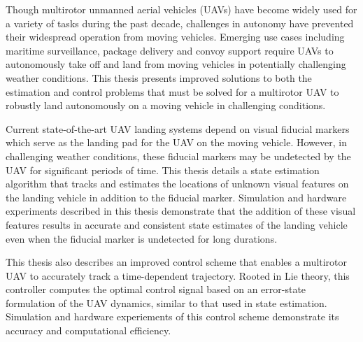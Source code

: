 \afterpage{\cleardoublepage}
Though multirotor unmanned aerial vehicles (UAVs) have become widely used for a variety of
tasks during the past decade, challenges in autonomy have prevented their
widespread operation from moving vehicles. Emerging use cases including maritime
surveillance, package delivery and convoy support require UAVs to autonomously
take off and land from moving vehicles in potentially challenging weather
conditions. This thesis presents improved solutions to both the estimation and
control problems that must be solved for a multirotor UAV to robustly land
autonomously on a moving vehicle in challenging conditions.

Current state-of-the-art UAV landing systems depend on visual fiducial markers
which serve as the landing pad for the UAV on the moving vehicle. However, in challenging weather
conditions, these fiducial markers may be undetected by the UAV for significant
periods of time. This thesis details a state estimation algorithm that tracks
and estimates the locations of unknown visual features on the landing vehicle in
addition to the fiducial marker. Simulation and hardware experiments described
in this thesis demonstrate that the addition of these visual features results in
accurate and consistent state estimates of the landing vehicle even when the
fiducial marker is undetected for long durations.

This thesis also describes an improved control scheme that enables a multirotor
UAV to accurately track a time-dependent trajectory. Rooted in Lie theory, this
controller computes the optimal control signal based on an error-state
formulation of the UAV dynamics, similar to that used in state estimation.
Simulation and hardware experiements of this control scheme demonstrate its
accuracy and computational efficiency.
